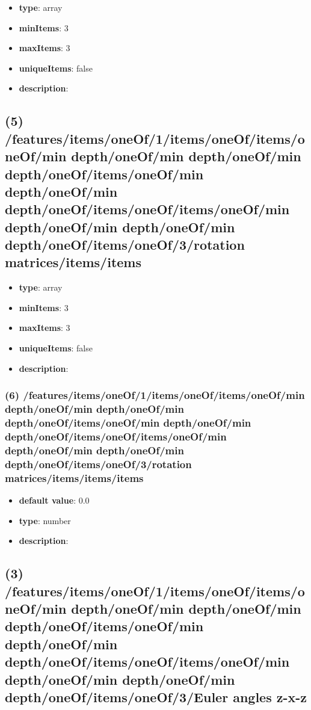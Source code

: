 \begin{itemize}[leftmargin=4em]\item {\bf type}: array
\item {\bf minItems}: 3
\item {\bf maxItems}: 3
\item {\bf uniqueItems}: false
\item {\bf description}: 
\end{itemize}\subsection{(5) /features/items/oneOf/1/items/oneOf/items/oneOf/min depth/oneOf/min depth/oneOf/min depth/oneOf/items/oneOf/min depth/oneOf/min depth/oneOf/items/oneOf/items/oneOf/min depth/oneOf/min depth/oneOf/min depth/oneOf/items/oneOf/3/rotation matrices/items/items}
\begin{itemize}[leftmargin=5em]\item {\bf type}: array
\item {\bf minItems}: 3
\item {\bf maxItems}: 3
\item {\bf uniqueItems}: false
\item {\bf description}: 
\end{itemize}\subsubsection{(6) /features/items/oneOf/1/items/oneOf/items/oneOf/min depth/oneOf/min depth/oneOf/min depth/oneOf/items/oneOf/min depth/oneOf/min depth/oneOf/items/oneOf/items/oneOf/min depth/oneOf/min depth/oneOf/min depth/oneOf/items/oneOf/3/rotation matrices/items/items/items}
\begin{itemize}[leftmargin=6em]\item {\bf default value}: 0.0
\item {\bf type}: number
\item {\bf description}: 
\end{itemize}\subsection{(3) /features/items/oneOf/1/items/oneOf/items/oneOf/min depth/oneOf/min depth/oneOf/min depth/oneOf/items/oneOf/min depth/oneOf/min depth/oneOf/items/oneOf/items/oneOf/min depth/oneOf/min depth/oneOf/min depth/oneOf/items/oneOf/3/Euler angles z-x-z}
